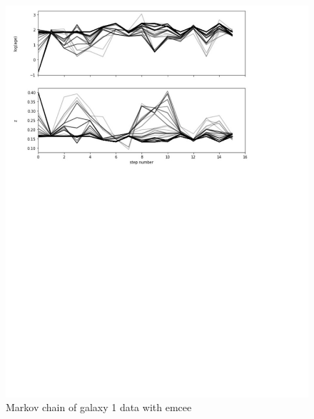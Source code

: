 \documentclass{article}
\begin{document}
\begin{figure}[H]
  \centering
\includegraphics[scale=0.5]{Markov chain Galaxy 2}
\caption{Markov chain of galaxy 1 data with emcee}
\end{figure}
\end{document}
